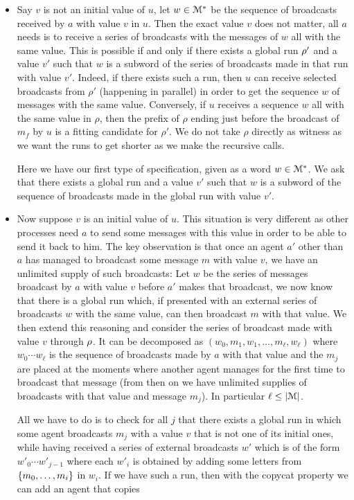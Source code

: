 \begin{itemize}
	\item 
	Say $v$ is not an initial value of $u$, let $w \in \mathcal{M}^*$ be the sequence of broadcasts received by $a$ with value $v$ in $u$. Then the exact value $v$ does not matter, all $a$ needs is to receive a series of broadcasts with the messages of $w$ all with the same value. This is possible if and only if there exists a global run $\rho'$ and a value $v'$ such that $w$ is a subword of the series of broadcasts made in that run with value $v'$. Indeed, if there exists such a run, then $u$ can receive selected broadcasts from $\rho'$ (happening in parallel) in order to get the sequence $w$ of messages with the same value. Conversely, if $u$ receives a sequence $w$ all with the same value in $\rho$, then the prefix of $\rho$ ending just before the broadcast of $m_f$ by $u$ is a fitting candidate for $\rho'$.
	We do not take $\rho$ directly as witness as we want the runs to get shorter as we make the recursive calls.
	
	Here we have our first type of specification, given as a word $w \in \mathcal{M}^*$. We ask that there exists a global run and a value $v'$ such that $w$ is a subword of the sequence of broadcasts made in the global run with value $v'$.
	
	
	\item 	
	Now suppose $v$ is an initial value of $u$. This situation is very different as other processes need $a$ to send some messages with this value in order to be able to send it back to him.
	The key observation is that once an agent $a'$ other than $a$ has managed to broadcast some message $m$ with value $v$, we have an unlimited supply of such broadcasts:
	Let $w$ be the series of messages broadcast by $a$ with value $v$ before $a'$ makes that broadcast, we now know that there is a global run which, if presented with an external series of broadcasts $w$ with the same value, can then broadcast $m$ with that value.
	We then extend this reasoning and consider the series of broadcast made with value $v$ through $\rho$. It can be decomposed as  $(w_0, m_1, w_1, \ldots, m_\ell, w_\ell)$ where $w_0 \cdots w_\ell$ is the sequence of broadcasts made by $a$ with that value and the $m_j$ are placed at the moments where another agent manages for the first time to broadcast that message (from then on we have unlimited supplies of broadcasts with that value and message $m_j$). In particular $\ell \leq |\mathcal{M}|$.
	
	All we have to do is to check for all $j$ that there exists a global run in which some agent broadcasts $m_j$ with a value $v$ that is not one of its initial ones, while having received a series of external broadcasts $w'$ which is of the form $w'_0\cdots w'_{j-1}$ where each $w'_i$ is obtained by adding some letters from $\{m_0, \ldots, m_i\}$ in $w_i$.
	If we have such a run, then with the copycat property we can add an  agent that copies 
	

\end{itemize}
